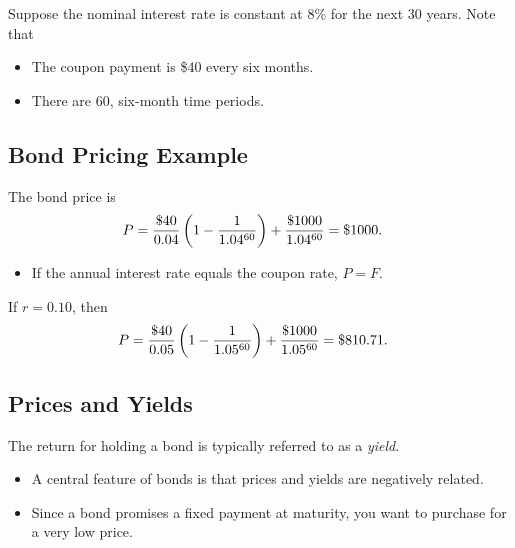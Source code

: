 \documentclass[letterpaper,10pt,english]{sphinxmanual}
\begin{document}
Suppose the nominal interest rate is constant at 8\% for the next 30
years.  Note that
\begin{itemize}
\item {} 
The coupon payment is \$40 every six months.

\end{itemize}
\begin{itemize}
\item {} 
There are 60, six-month time periods.

\end{itemize}


\subsection{Bond Pricing Example}
\label{bondPrices:id9}
The bond price is
\begin{gather}
\begin{split}P & = \frac{\$40}{0.04}\left(1 - \frac{1}{1.04^{60}}\right) +
\frac{\$1000}{1.04^{60}} = \$1000.\end{split}\notag
\end{gather}\begin{itemize}
\item {} 
If the annual interest rate equals the coupon rate, $P = F$.

\end{itemize}

If $r = 0.10$, then
\begin{gather}
\begin{split}P & = \frac{\$40}{0.05}\left(1 - \frac{1}{1.05^{60}}\right) +
\frac{\$1000}{1.05^{60}} = \$810.71.\end{split}\notag
\end{gather}

\subsection{Prices and Yields}
\label{bondPrices:prices-and-yields}
The return for holding a bond is typically referred to as a \emph{yield}.
\begin{itemize}
\item {} 
A central feature of bonds is that prices and yields are negatively
related.

\end{itemize}
\begin{itemize}
\item {} 
Since a bond promises a fixed payment at maturity, you want to
purchase for a very low price.

\end{itemize}
\end{document}
